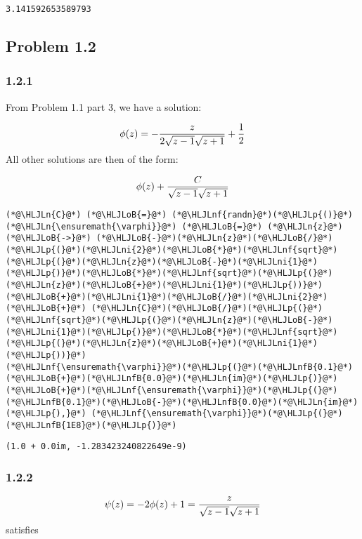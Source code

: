 \documentclass[12pt,a4paper]{article}
\newcommand{\HLJLn}[1]{#1}
\newcommand{\HLJLnf}[1]{\textcolor[RGB]{66,102,213}{#1}}
\newcommand{\HLJLnfB}[1]{\textcolor[RGB]{59,151,46}{#1}}
\newcommand{\HLJLni}[1]{\textcolor[RGB]{59,151,46}{#1}}
\newcommand{\HLJLoB}[1]{\textcolor[RGB]{102,102,102}{\textbf{#1}}}
\newcommand{\HLJLp}[1]{#1}
\begin{document}
\begin{lstlisting}
3.141592653589793
\end{lstlisting}


\subsection{Problem 1.2}
\subsubsection{1.2.1}
From Problem 1.1 part 3, we have a solution:

\[
\phi(z) = -{ z  \over 2 \sqrt{z -1} \sqrt{z+1}} + {1 \over 2}
\]
All other solutions are then of the form:

\[
\phi(z) + {C \over \sqrt{z-1} \sqrt{z+1}}
\]

\begin{lstlisting}
(*@\HLJLn{C}@*) (*@\HLJLoB{=}@*) (*@\HLJLnf{randn}@*)(*@\HLJLp{()}@*)
(*@\HLJLn{\ensuremath{\varphi}}@*) (*@\HLJLoB{=}@*) (*@\HLJLn{z}@*) (*@\HLJLoB{->}@*) (*@\HLJLoB{-}@*)(*@\HLJLn{z}@*)(*@\HLJLoB{/}@*)(*@\HLJLp{(}@*)(*@\HLJLni{2}@*)(*@\HLJLoB{*}@*)(*@\HLJLnf{sqrt}@*)(*@\HLJLp{(}@*)(*@\HLJLn{z}@*)(*@\HLJLoB{-}@*)(*@\HLJLni{1}@*)(*@\HLJLp{)}@*)(*@\HLJLoB{*}@*)(*@\HLJLnf{sqrt}@*)(*@\HLJLp{(}@*)(*@\HLJLn{z}@*)(*@\HLJLoB{+}@*)(*@\HLJLni{1}@*)(*@\HLJLp{))}@*)(*@\HLJLoB{+}@*)(*@\HLJLni{1}@*)(*@\HLJLoB{/}@*)(*@\HLJLni{2}@*) (*@\HLJLoB{+}@*) (*@\HLJLn{C}@*)(*@\HLJLoB{/}@*)(*@\HLJLp{(}@*)(*@\HLJLnf{sqrt}@*)(*@\HLJLp{(}@*)(*@\HLJLn{z}@*)(*@\HLJLoB{-}@*)(*@\HLJLni{1}@*)(*@\HLJLp{)}@*)(*@\HLJLoB{*}@*)(*@\HLJLnf{sqrt}@*)(*@\HLJLp{(}@*)(*@\HLJLn{z}@*)(*@\HLJLoB{+}@*)(*@\HLJLni{1}@*)(*@\HLJLp{))}@*)
(*@\HLJLnf{\ensuremath{\varphi}}@*)(*@\HLJLp{(}@*)(*@\HLJLnfB{0.1}@*)(*@\HLJLoB{+}@*)(*@\HLJLnfB{0.0}@*)(*@\HLJLn{im}@*)(*@\HLJLp{)}@*)(*@\HLJLoB{+}@*)(*@\HLJLnf{\ensuremath{\varphi}}@*)(*@\HLJLp{(}@*)(*@\HLJLnfB{0.1}@*)(*@\HLJLoB{-}@*)(*@\HLJLnfB{0.0}@*)(*@\HLJLn{im}@*)(*@\HLJLp{),}@*) (*@\HLJLnf{\ensuremath{\varphi}}@*)(*@\HLJLp{(}@*)(*@\HLJLnfB{1E8}@*)(*@\HLJLp{)}@*)
\end{lstlisting}

\begin{lstlisting}
(1.0 + 0.0im, -1.283423240822649e-9)
\end{lstlisting}


\subsubsection{1.2.2}
\[
\psi(z) = -2\phi(z) + 1 = { z  \over  \sqrt{z -1} \sqrt{z+1}}
\]
satisfies
\end{document}
